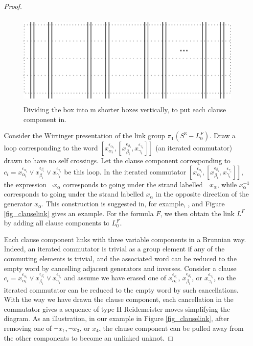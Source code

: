 \documentclass[12pt]{amsart}
\theoremstyle{definition}
\theoremstyle{remark}
\begin{document}
\begin{proof}
\begin{figure}[ht]
\centering
\includegraphics[height=1.8in]{relationarea.png}
\caption{Dividing the box into m shorter boxes vertically, to put each clause component in. }
\label{fig_relationarea}
\end{figure}


Consider the Wirtinger presentation of the link group $\pi_1(S^3-L^F_0)$.  Draw a loop corresponding to the word $[x_{\alpha_i}^{\epsilon_{\alpha_i}}, [ x_{\beta_i}^{\epsilon_{\beta_i}}, x_{\gamma_i}^{\epsilon_{\gamma_i}}]]$ (an iterated commutator) drawn to have no self crossings. Let the clause component corresponding to $c_i = x_{\alpha_i}^{\epsilon_{\alpha_i}} \vee x_{\beta_i}^{\epsilon_{\beta_i}} \vee x_{\gamma_i}^{\epsilon_{\gamma_i}}$  be this loop. In the iterated commutator $[x_{\alpha_i}^{\epsilon_{\alpha_i}}, [ x_{\beta_i}^{\epsilon_{\beta_i}}, x_{\gamma_i}^{\epsilon_{\gamma_i}}]]$, the expression $\neg x_\alpha$ corresponds to going under the strand labelled $\neg x_\alpha$, while $x_\alpha^{-1}$ corresponds to going under the strand labelled $x_\alpha$ in the opposite direction of the generator $x_\alpha$. This construction is suggested in, for example, \cite{Rolfsen1}, and Figure \ref{fig_clauselink} gives an example.  For the formula $F$, we then obtain the link $L^F$ by adding all clause components to $L_0^F$.

Each clause component links with three variable components in a Brunnian way. Indeed, an iterated commutator is trivial as a group element if any of the commuting elements is trivial, and the associated word can be reduced to the empty word by cancelling adjacent generators and inverses.  Consider a clause $c_i = x_{\alpha_i}^{\epsilon_{\alpha_i}} \vee x_{\beta_i}^{\epsilon_{\beta_i}} \vee x_{\gamma_i}^{\epsilon_{\gamma_i}}$ and assume we have erased one of $x_{\alpha_i}^{\epsilon_{\alpha_i}}$, $x_{\beta_i}^{\epsilon_{\beta_i}}$, or $x_{\gamma_i}^{\epsilon_{\gamma_i}}$, so the iterated commutator can be reduced to the empty word by such cancellations.  With the way we have drawn the clause component, each cancellation in the commutator gives a sequence of type II Reidemeister moves simplifying the diagram.  As an illustration, in our example in Figure \ref{fig_clauselink}, after removing one of $\neg x_1, \neg x_3$, or $x_4$, the clause component can be pulled away from the other components to become an unlinked unknot.


\end{proof}
\end{document}
